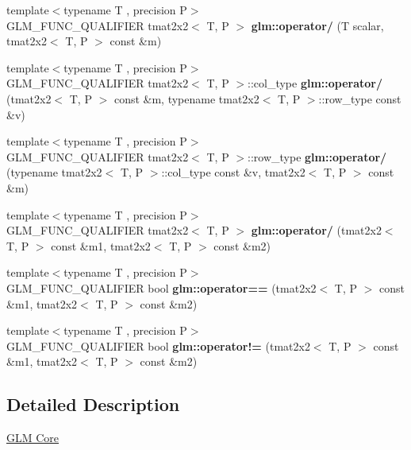 \begin{DoxyCompactItemize}
\mbox{\label{type__mat2x2_8inl_afafc9c83689d72481193748fb80a079f}} 
{\footnotesize template$<$typename T , precision P$>$ }\\G\+L\+M\+\_\+\+F\+U\+N\+C\+\_\+\+Q\+U\+A\+L\+I\+F\+I\+ER tmat2x2$<$ T, P $>$ {\bfseries glm\+::operator/} (T scalar, tmat2x2$<$ T, P $>$ const \&m)
\item 
\mbox{\label{type__mat2x2_8inl_a41ca2c01300738deb25fbc9a9e630cd4}} 
{\footnotesize template$<$typename T , precision P$>$ }\\G\+L\+M\+\_\+\+F\+U\+N\+C\+\_\+\+Q\+U\+A\+L\+I\+F\+I\+ER tmat2x2$<$ T, P $>$\+::col\+\_\+type {\bfseries glm\+::operator/} (tmat2x2$<$ T, P $>$ const \&m, typename tmat2x2$<$ T, P $>$\+::row\+\_\+type const \&v)
\item 
\mbox{\label{type__mat2x2_8inl_a48dab5d24cd57eed83bce16c3e44a206}} 
{\footnotesize template$<$typename T , precision P$>$ }\\G\+L\+M\+\_\+\+F\+U\+N\+C\+\_\+\+Q\+U\+A\+L\+I\+F\+I\+ER tmat2x2$<$ T, P $>$\+::row\+\_\+type {\bfseries glm\+::operator/} (typename tmat2x2$<$ T, P $>$\+::col\+\_\+type const \&v, tmat2x2$<$ T, P $>$ const \&m)
\item 
\mbox{\label{type__mat2x2_8inl_a94743dfdf0d7c17b17f87e7253583853}} 
{\footnotesize template$<$typename T , precision P$>$ }\\G\+L\+M\+\_\+\+F\+U\+N\+C\+\_\+\+Q\+U\+A\+L\+I\+F\+I\+ER tmat2x2$<$ T, P $>$ {\bfseries glm\+::operator/} (tmat2x2$<$ T, P $>$ const \&m1, tmat2x2$<$ T, P $>$ const \&m2)
\item 
\mbox{\label{type__mat2x2_8inl_adedfd20e640bc56d8a720e541e958ca2}} 
{\footnotesize template$<$typename T , precision P$>$ }\\G\+L\+M\+\_\+\+F\+U\+N\+C\+\_\+\+Q\+U\+A\+L\+I\+F\+I\+ER bool {\bfseries glm\+::operator==} (tmat2x2$<$ T, P $>$ const \&m1, tmat2x2$<$ T, P $>$ const \&m2)
\item 
\mbox{\label{type__mat2x2_8inl_aa7932b253b4552536b3e7e9b6853a937}} 
{\footnotesize template$<$typename T , precision P$>$ }\\G\+L\+M\+\_\+\+F\+U\+N\+C\+\_\+\+Q\+U\+A\+L\+I\+F\+I\+ER bool {\bfseries glm\+::operator!=} (tmat2x2$<$ T, P $>$ const \&m1, tmat2x2$<$ T, P $>$ const \&m2)
\end{DoxyCompactItemize}


\subsection{Detailed Description}
\hyperlink{group__core}{G\+LM Core} 